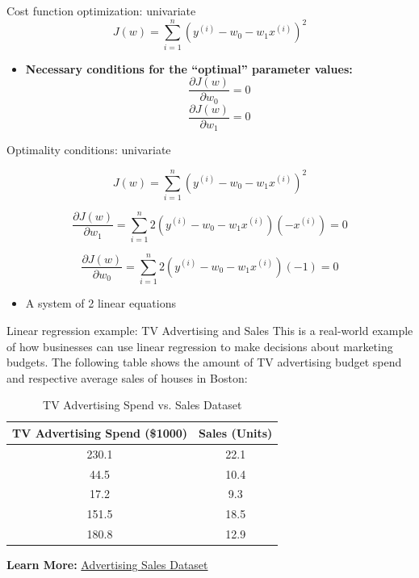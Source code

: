 \documentclass[serif, aspectratio=169]{beamer}
\begin{document}
\begin{frame}{Cost function optimization: univariate}
    \[
    J(w) = \sum_{i=1}^{n} \left( y^{(i)} - w_0 - w_1 x^{(i)} \right)^2
    \]
    
    \begin{itemize}
        \item \textbf{Necessary conditions for the “optimal” parameter values:}
        \[
        \frac{\partial J(w)}{\partial w_0} = 0
        \]
        \[
        \frac{\partial J(w)}{\partial w_1} = 0
        \]
    \end{itemize}

\end{frame}


\begin{frame}{Optimality conditions: univariate}

    \[
    J(w) = \sum_{i=1}^{n} \left( y^{(i)} - w_0 - w_1 x^{(i)} \right)^2
    \]
    
    \[
    \frac{\partial J(w)}{\partial w_1} = \sum_{i=1}^{n} 2 \left( y^{(i)} - w_0 - w_1 x^{(i)} \right) (-x^{(i)}) = 0
    \]
    
    \[
    \frac{\partial J(w)}{\partial w_0} = \sum_{i=1}^{n} 2 \left( y^{(i)} - w_0 - w_1 x^{(i)} \right) (-1) = 0
    \]
    
    \begin{itemize}
        \item A system of 2 linear equations
    \end{itemize}

\end{frame}

\begin{frame}{Linear regression example: TV Advertising and Sales}
    This is a real-world example of how businesses can use linear regression to make decisions about marketing budgets. The following table shows the amount of TV advertising budget spend and respective average sales of houses in Boston:
    \begin{table}[h!]
    \centering
    \begin{tabular}{|c|c|}
    \hline
    \textbf{TV Advertising Spend (\$1000)} & \textbf{Sales (Units)} \\ \hline
    230.1                                  & 22.1                   \\ \hline
    44.5                                   & 10.4                   \\ \hline
    17.2                                   & 9.3                    \\ \hline
    151.5                                  & 18.5                   \\ \hline
    180.8                                  & 12.9                   \\ \hline
    \end{tabular}
    \caption{TV Advertising Spend vs. Sales Dataset}
    \end{table}
    
\textbf{Learn More:}
\href{https://www.kaggle.com/datasets/yasserh/advertising-sales-dataset}{Advertising Sales Dataset}
\end{frame}
\end{document}
